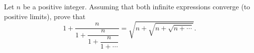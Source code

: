 Let $n$ be a positive integer. Assuming that both infinite expressions converge (to positive limits), prove that
\[1+\dfrac{n}{1+\dfrac{n}{1+\dfrac{n}{1+\cdots}}}=\sqrt{n+\sqrt{n+\sqrt{n+\cdots}}}.\]
